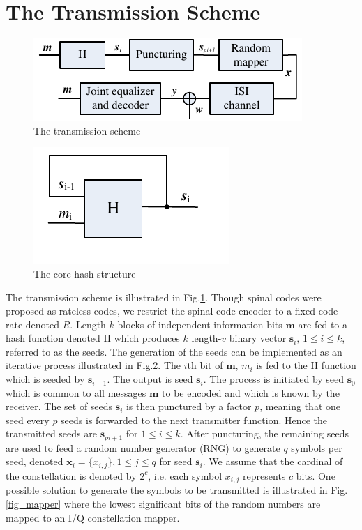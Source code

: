 \documentclass[conference]{IEEEtran}
\begin{document}
\section{The Transmission Scheme} \label{sec:TXscheme}
\begin{figure}[ht]
\centering
\includegraphics[width=0.9\columnwidth]{tranScheme.pdf}
\caption{The transmission scheme}
\label{fig_tranScheme}
\end{figure}
\begin{figure}[ht]
\centering
\includegraphics[width=1.75 in]{encoderCore.pdf}
\caption{The core hash structure}
\label{fig_hash}
\end{figure}
The transmission scheme is illustrated in Fig.\ref{fig_tranScheme}. Though spinal codes were  proposed as rateless codes, we restrict the spinal code encoder to a fixed code rate denoted $R$. Length-$k$ blocks of independent information bits ${\bm m}$ are fed to a hash function denoted H which produces $k$ length-$v$ binary vector $\bm s_i,\,1\leq i \leq k$, referred to as the seeds. The generation of the seeds can be implemented as an iterative process illustrated in Fig.\ref{fig_hash}. The $i$th bit of $\bm m$, $m_i$ is fed to the H function which is seeded by $\bm s_{i-1}$. The output is seed $\bm s_i$. The process is initiated by seed $\bm s_0$ which is common to all messages $\bm m$ to be encoded and which is known by the receiver. The set of seeds $\bm s_i$ is then punctured by a factor $p$, meaning that one seed every $p$ seeds is forwarded to the next transmitter function. Hence the transmitted seeds are $\bm s_{pi+1}$ for $1\leq i \leq k$. After puncturing, the remaining seeds are used to feed a random number generator (RNG) to generate $q$ symbols per seed, denoted ${\bm x_i} = \{x_{i,j}\}, 1\leq j \leq q$ for seed $\bm s_i$. We assume that the cardinal of the constellation is denoted by $2^c$, i.e. each symbol $x_{i,j}$ represents $c$ bits. One possible solution to generate the symbols to be transmitted is illustrated in Fig.\ref{fig_mapper} where the lowest significant bits of the random numbers are mapped to an I/Q constellation mapper.
\end{document}
